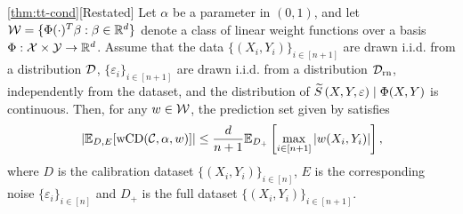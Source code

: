 \label{sec:tt_app}
\begin{customthm}{\ref*{thm:tt-cond}}[Restated]
       Let $\alpha$ be a parameter in $(0,1)$, and let ${\cal W} = \{\Phi(\cdot)^T \beta :\beta \in \mathbb{R}^d\}$ denote a class of linear weight functions over a basis $\Phi : {\cal X} \times {\cal Y} \to \mathbb{R}^d$. Assume that the data $\{(X_i,Y_i)\}_{i\in [n+1]}$ are drawn \mbox{i.i.d.} from a distribution ${\cal D}$, $\{\varepsilon_i\}_{i\in [n+1]}$ are drawn \mbox{i.i.d.} from a distribution ${\cal D}_{\text{rn}}$, independently from the dataset, and the distribution of ${\widetilde{S}}\left(X,Y, \varepsilon\right) \mid \Phi(X,Y)$ is continuous. Then, for any $w \in {\cal W}$, the prediction set given by  satisfies 
    \begin{align*}
       |\mathbb{E}_{D,E} [ \text{wCD}({\cal C}, \alpha,w)]| \leq \frac{d}{n+1} \mathbb{E}_{D_{+}}\left[ \max_{i \in [n+1]}|w(X_i,Y_i)|\right],
    \end{align*}
    where $D$ is the calibration dataset $\{(X_i,Y_i)\}_{i\in[n]}$, $E$ is the corresponding noise $\{\varepsilon_i\}_{i \in [n]}$ and $D_{+}$ is the full dataset $\{(X_i,Y_i)\}_{i\in[n+1]}$.
\end{customthm}
